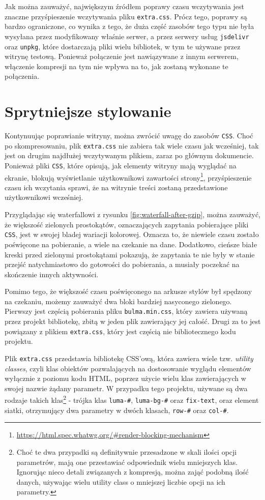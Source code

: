 \documentclass[licencjacka]{pracadypl}
\begin{document}
Jak można zauważyć, największym źródłem poprawy czasu wczytywania jest znaczne przyśpieszenie wczytywania pliku \texttt{extra.css}. Prócz tego, poprawy są bardzo ograniczone, co wynika z tego, że duża część zasobów tego typu nie była wysyłana przez modyfikowany właśnie serwer, a przez serwery usług \texttt{jsdelivr} oraz \texttt{unpkg}, które dostarczają pliki wielu bibliotek, w tym te używane przez witrynę testową. Ponieważ połączenie jest nawiązywane z innym serwerem, włączenie kompresji na tym nie wpływa na to, jak zostaną wykonane te połączenia.




\section{Sprytniejsze stylowanie}

Kontynuując poprawianie witryny, można zwrócić uwagę do zasobów \texttt{CSS}. Choć po skompresowaniu, plik \texttt{extra.css} nie zabiera tak wiele czasu jak wcześniej, tak jest on drugim najdłużej wczytywanym plikiem, zaraz po głównym dokumencie. Ponieważ pliki \texttt{CSS}, które opisują, jak elementy witryny mają wyglądać na ekranie, blokują wyświetlanie użytkownikowi zawartości strony\footnote{\url{https://html.spec.whatwg.org/\#render-blocking-mechanism}}, przyśpieszenie czasu ich wczytania sprawi, że na witrynie treści zostaną przedstawione użytkownikowi wcześniej.

Przyglądając się waterfallowi z rysunku \ref{fig:waterfall-after-gzip}, można zauważyć, że większość zielonych prostokątów, oznaczających zapytania pobierające pliki \texttt{CSS}, jest w swojej bladej wariacji kolorowej. Oznacza to, że niewiele czasu zostało poświęcone na pobieranie, a wiele na czekanie na dane. Dodatkowo, cieńsze białe kreski przed zielonymi prostokątami pokazują, że zapytania te nie były w stanie przejść natychmiastowo do gotowości do pobierania, a musiały poczekać na skończenie innych aktywności. 

Pomimo tego, że większość czasu poświęconego na arkusze stylów był spędzony na czekaniu, możemy zauważyć dwa bloki bardziej nasyconego zielonego. Pierwszy jest częścią pobierania pliku \texttt{bulma.min.css}, który zawiera używaną przez projekt bibliotekę, zbitą w jeden plik zawierający jej całość. Drugi za to jest powiązany z plikiem \texttt{extra.css}, który jest częścią nie bibliotecznego kodu projektu.

Plik \texttt{extra.css} przedstawia bibliotekę CSS'ową, która zawiera wiele tzw. \emph{utility classes}, czyli klas obiektów pozwalających na dostosowanie wyglądu elementów wyłącznie z poziomu kodu HTML, poprzez użycie wielu klas zawierających w swojej nazwie żądany parametr. W przypadku tego projektu, używane są dwa rodzaje takich klas\footnote{Choć te dwa przypadki są definitywnie przesadzone w skali ilości opcji parametrów, mają one przestawiać odpowiednik wielu mniejszych klas. Ignorując nieco detali związanych z kompresją, można zająć podobną ilość danych, używając wielu utility class o mniejszej liczbie opcji na ich parametry.} - trójka klas \texttt{luma-\#}, \texttt{luma-bg-\#} oraz \texttt{fix-text}, oraz element siatki, otrzymujący dwa parametry w dwóch klasach, \texttt{row-\#} oraz \texttt{col-\#}.
\end{document}
